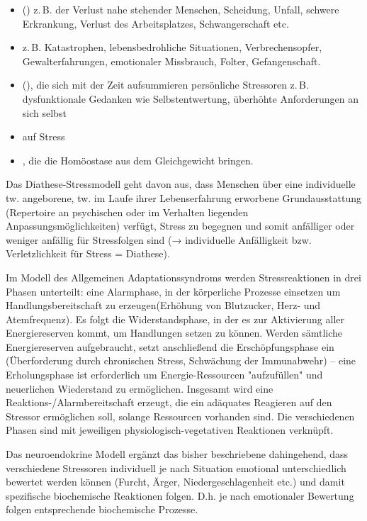 \begin{itemize}
  \item {} ()
  z.\,B. der Verlust nahe stehender Menschen, Scheidung,
  Unfall, schwere Erkrankung, Verlust des Arbeitsplatzes,
  Schwangerschaft etc.
  \item {}
  z.\,B. Katastrophen, lebensbedrohliche Situationen,
  Verbrechensopfer, Gewalterfahrungen, emotionaler
  Missbrauch, Folter, Gefangenschaft.
  \item {} (), die sich mit der Zeit aufsummieren persönliche
  Stressoren z.\,B. dysfunktionale Gedanken wie
  Selbstentwertung, überhöhte Anforderungen an sich selbst
  \item {} auf Stress
  \item {}, die die Homöostase
  aus dem Gleichgewicht bringen.
\end{itemize}

Das Diathese-Stressmodell geht davon aus, dass Menschen über eine individuelle tw. angeborene, tw. im Laufe ihrer Lebenserfahrung erworbene Grundausstattung (Repertoire an psychischen oder im Verhalten liegenden Anpassungsmöglichkeiten) verfügt, Stress zu begegnen und somit anfälliger oder weniger anfällig für Stressfolgen sind (→ individuelle Anfälligkeit bzw. Verletzlichkeit für Stress = Diathese). 

Im Modell des Allgemeinen Adaptationssyndroms werden Stressreaktionen in drei Phasen unterteilt: eine Alarmphase, in der körperliche Prozesse einsetzen um Handlungsbereitschaft zu erzeugen(Erhöhung von Blutzucker, Herz- und Atemfrequenz). Es folgt die Widerstandsphase, in der es zur Aktivierung aller Energiereserven kommt, um Handlungen setzen zu können. Werden sämtliche Energiereserven aufgebraucht, setzt anschließend die Erschöpfungsphase ein (Überforderung durch chronischen Stress, Schwächung der Immunabwehr) – eine Erholungsphase ist erforderlich um Energie-Ressourcen "aufzufüllen" und neuerlichen Wiederstand zu ermöglichen. Insgesamt wird eine Reaktions-/Alarmbereitschaft erzeugt, die ein adäquates Reagieren auf den Stressor ermöglichen soll, solange
Ressourcen vorhanden sind. Die verschiedenen Phasen sind mit jeweiligen
physiologisch-vegetativen Reaktionen verknüpft. 

Das neuroendokrine Modell ergänzt das bisher beschriebene dahingehend, dass verschiedene Stressoren individuell je nach Situation emotional unterschiedlich bewertet werden können (Furcht, Ärger, Niedergeschlagenheit etc.) und damit spezifische biochemische Reaktionen folgen. D.h. je nach emotionaler Bewertung folgen entsprechende biochemische Prozesse.

